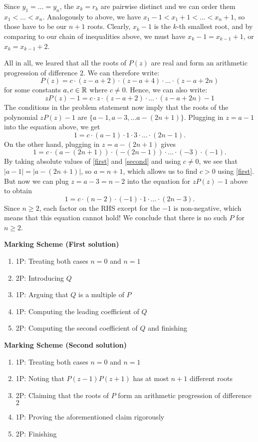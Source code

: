 {Since $y_1 = \ldots = y_n$, the $x_k = r_k$ are pairwise distinct and we can order them $x_1 < \dots < x_n$. Analogously to above, we have
$x_1 - 1 < x_1 + 1 < \dots < x_n + 1$, so those have to be our $n+1$ roots. Clearly, $x_k-1$ is the $k$-th smallest root, and by comparing to our chain of inequalities above, we must have $x_k-1 = x_{k-1} + 1$, or $x_k = x_{k-1}+2$.

All in all, we leared that all the roots of $P(z)$ are real and form an arithmetic progression of difference $2$. We can therefore write:
\[
P(z) = c \cdot (z-a+2) \cdot (z-a+4) \cdot \ldots \cdot (z-a+2n)
\]
for some constants $a, c \in \mathbb{R}$ where $c \neq 0$. Hence, we can also write:
\[
zP(z) - 1 = c \cdot z \cdot (z-a+2) \cdot \ldots \cdot (z-a+2n) - 1 
\]
The conditions in the problem statement now imply that the roots of the polynomial $zP(z)-1$ are $\{a-1, a-3, \dots a-(2n+1) \}$. Plugging in $z=a-1$ into the equation above, we get
\begin{equation}
\label{first}
1 = c \cdot (a-1) \cdot 1 \cdot 3 \cdot \ldots  \cdot (2n-1). \tag{$\star$}
\end{equation}
On the other hand, plugging in $z= a-(2n+1)$ gives
\begin{equation}
\label{second}
    1 = c \cdot (a - (2n+1)) \cdot (-(2n-1)) \cdot \ldots \cdot (-3) \cdot (-1). \tag{$\star \star$}
\end{equation}
By taking absolute values of \eqref{first} and \eqref{second} and using $c \neq 0$, we see that $ |a-1| = |a-(2n+1)|$, so $a = n+1$, which allows us to find $c>0$ using \eqref{first}. But now we can plug $z=a-3 = n-2$ into the equation for $zP(z)-1$ above to obtain
\[
1 = c \cdot (n-2) \cdot (-1) \cdot 1 \cdot \ldots \cdot (2n-3).
\]
Since $n \geq 2$, each factor on the RHS except for the $-1$ is non-negative, which means that this equation cannot hold! We conclude that there is no such $P$ for $n \geq 2$.

\newpage

\textbf{Marking Scheme (First solution)}
\begin{enumerate}
    \item 1P: Treating both cases $n=0$ and $n= 1$
    \item 2P: Introducing $Q$
    \item 1P: Arguing that $Q$ is a multiple of $P$
    \item 1P: Computing the leading coefficient of $Q$
    \item 2P: Computing the second coefficient of $Q$ and finishing
\end{enumerate}

\textbf{Marking Scheme (Second solution)}
\begin{enumerate}
    \item 1P: Treating both cases $n=0$ and $n=1$
    \item 1P: Noting that $P(z-1)P(z+1)$ has at most $n+1$ different roots
    \item 2P: Claiming that the roots of $P$ form an arithmetic progression of difference $2$
    \item 1P: Proving the aforementioned claim rigorously
    \item 2P: Finishing 
\end{enumerate}

}
